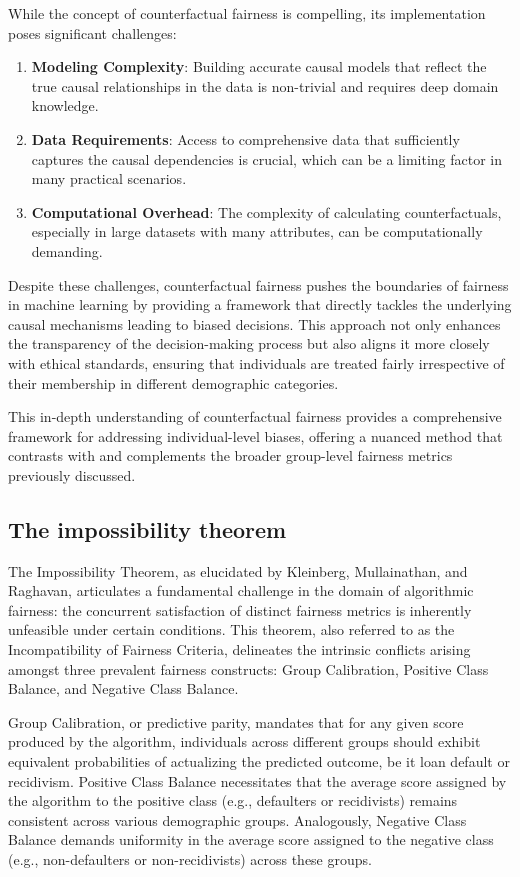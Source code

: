 While the concept of counterfactual fairness is compelling, its implementation poses significant challenges:
\begin{enumerate}
    \item \textbf{Modeling Complexity}: Building accurate causal models that reflect the true causal relationships in the data is non-trivial and requires deep domain knowledge.
    \item \textbf{Data Requirements}: Access to comprehensive data that sufficiently captures the causal dependencies is crucial, which can be a limiting factor in many practical scenarios.
    \item \textbf{Computational Overhead}: The complexity of calculating counterfactuals, especially in large datasets with many attributes, can be computationally demanding.
\end{enumerate}

Despite these challenges, counterfactual fairness pushes the boundaries of fairness in machine learning by providing a framework that directly tackles the underlying causal mechanisms leading to biased decisions. This approach not only enhances the transparency of the decision-making process but also aligns it more closely with ethical standards, ensuring that individuals are treated fairly irrespective of their membership in different demographic categories.

This in-depth understanding of counterfactual fairness provides a comprehensive framework for addressing individual-level biases, offering a nuanced method that contrasts with and complements the broader group-level fairness metrics previously discussed.


\subsection{The impossibility theorem}

The Impossibility Theorem, as elucidated by Kleinberg, Mullainathan, and Raghavan, articulates a fundamental challenge in the domain of algorithmic fairness: the concurrent satisfaction of distinct fairness metrics is inherently unfeasible under certain conditions. This theorem, also referred to as the Incompatibility of Fairness Criteria, delineates the intrinsic conflicts arising amongst three prevalent fairness constructs: Group Calibration, Positive Class Balance, and Negative Class Balance.

Group Calibration, or predictive parity, mandates that for any given score produced by the algorithm, individuals across different groups should exhibit equivalent probabilities of actualizing the predicted outcome, be it loan default or recidivism. Positive Class Balance necessitates that the average score assigned by the algorithm to the positive class (e.g., defaulters or recidivists) remains consistent across various demographic groups. Analogously, Negative Class Balance demands uniformity in the average score assigned to the negative class (e.g., non-defaulters or non-recidivists) across these groups.

